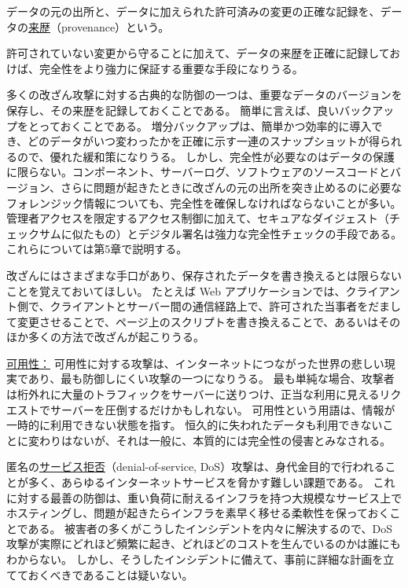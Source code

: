 \documentclass[uplatex]{jsarticle}
\def\label#1{}%
\begin{document}
\begin{dfn}[来歴]\label{dfn:ch1-provenance}
データの元の出所と、データに加えられた許可済みの変更の正確な記録を、データの\underline{来歴}（provenance）という。
\end{dfn}

許可されていない変更から守ることに加えて、データの来歴を正確に記録しておけば、完全性をより強力に保証する重要な手段になりうる。

多くの改ざん攻撃に対する古典的な防御の一つは、重要なデータのバージョンを保存し、その来歴を記録しておくことである。
簡単に言えば、良いバックアップをとっておくことである。
増分バックアップは、簡単かつ効率的に導入でき、どのデータがいつ変わったかを正確に示す一連のスナップショットが得られるので、優れた緩和策になりうる。
しかし、完全性が必要なのはデータの保護に限らない。コンポーネント、サーバーログ、ソフトウェアのソースコードとバージョン、さらに問題が起きたときに改ざんの元の出所を突き止めるのに必要なフォレンジック情報についても、完全性を確保しなければならないことが多い。
管理者アクセスを限定するアクセス制御に加えて、セキュアなダイジェスト（チェックサムに似たもの）とデジタル署名は強力な完全性チェックの手段である。
これらについては第5章で説明する。

改ざんにはさまざまな手口があり、保存されたデータを書き換えるとは限らないことを覚えておいてほしい。
たとえば Web アプリケーションでは、クライアント側で、クライアントとサーバー間の通信経路上で、許可された当事者をだまして変更させることで、ページ上のスクリプトを書き換えることで、あるいはそのほか多くの方法で改ざんが起こりうる。

\underline{可用性：}
可用性に対する攻撃は、インターネットにつながった世界の悲しい現実であり、最も防御しにくい攻撃の一つになりうる。
最も単純な場合、攻撃者は桁外れに大量のトラフィックをサーバーに送りつけ、正当な利用に見えるリクエストでサーバーを圧倒するだけかもしれない。
可用性という用語は、情報が一時的に利用できない状態を指す。
恒久的に失われたデータも利用できないことに変わりはないが、それは一般に、本質的には完全性の侵害とみなされる。

匿名の\underline{サービス拒否}（denial-of-service, DoS）攻撃は、身代金目的で行われることが多く、あらゆるインターネットサービスを脅かす難しい課題である。
これに対する最善の防御は、重い負荷に耐えるインフラを持つ大規模なサービス上でホスティングし、問題が起きたらインフラを素早く移せる柔軟性を保っておくことである。
被害者の多くがこうしたインシデントを内々に解決するので、DoS 攻撃が実際にどれほど頻繁に起き、どれほどのコストを生んでいるのかは誰にもわからない。
しかし、そうしたインシデントに備えて、事前に詳細な計画を立てておくべきであることは疑いない。
\end{document}
